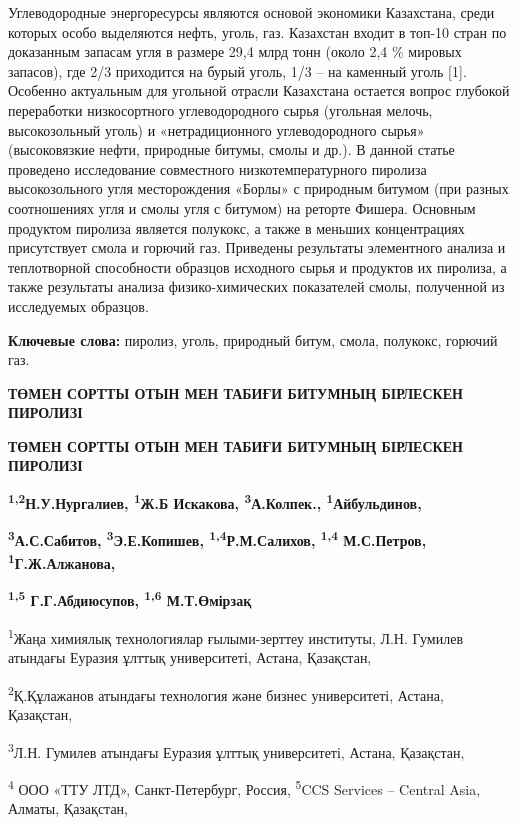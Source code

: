 Углеводородные энергоре­сурсы являются основой экономики Казахстана,
среди которых особо выделяются нефть, уголь, газ. Казахстан входит в
топ-10 стран по доказанным запасам угля в размере 29,4 млрд тонн (около
2,4 \% мировых запасов), где 2/3 приходится на бурый уголь, 1/3 -- на
каменный уголь {[}1{]}. Особенно актуальным для угольной отрасли
Казахстана остается вопрос глубокой переработки низкосортного
углеводородного сырья (угольная мелочь, высокозольный уголь) и
«нетрадиционного углеводородного сырья» (высоковязкие нефти, природные
битумы, смолы и др.). В данной статье проведено исследование совместного
низкотемпературного пиролиза высокозольного угля месторождения «Борлы» с
природным битумом (при разных соотношениях угля и смолы угля с битумом)
на реторте Фишера. Основным продуктом пиролиза является полукокс, а
также в меньших концентрациях присутствует смола и горючий газ.
Приведены результаты элементного анализа и теплотворной способности
образцов исходного сырья и продуктов их пиролиза, а также результаты
анализа физико-химических показателей смолы, полученной из исследуемых
образцов.

\textbf{Ключевые слова:} пиролиз, уголь, природный битум, смола,
полукокс, горючий газ.

\textbf{ТӨМЕН СОРТТЫ ОТЫН МЕН ТАБИҒИ БИТУМНЫҢ БІРЛЕСКЕН ПИРОЛИЗІ}

\textbf{ТӨМЕН СОРТТЫ ОТЫН МЕН ТАБИҒИ БИТУМНЫҢ БІРЛЕСКЕН ПИРОЛИЗІ}

\textbf{\textsuperscript{1,2}Н.У.Нургалиев, \textsuperscript{1}Ж.Б
Искакова, \textsuperscript{3}А.Колпек., \textsuperscript{1}Айбульдинов,}

\textbf{\textsuperscript{3}А.С.Сабитов, \textsuperscript{3}Э.Е.Копишев,
\textsuperscript{1,4}Р.М.Салихов, \textsuperscript{1,4} М.С.Петров,
\textsuperscript{1}Г.Ж.Алжанова,}

\textbf{\textsuperscript{1,5} Г.Г.Абдиюсупов, \textsuperscript{1,6}
М.Т.Өмірзақ}

\textsuperscript{1}Жаңа химиялық технологиялар ғылыми-зерттеу институты,
Л.Н. Гумилев атындағы Еуразия ұлттық университеті, Астана, Қазақстан,

\textsuperscript{2}Қ.Құлажанов атындағы технология және бизнес
университеті, Астана, Қазақстан,

\textsuperscript{3}Л.Н. Гумилев атындағы Еуразия ұлттық университеті,
Астана, Қазақстан,

\textsuperscript{4} ООО «ТТУ ЛТД», Санкт-Петербург, Россия,
\textsuperscript{5}CCS Services -- Central Asia, Алматы, Қазақстан,

